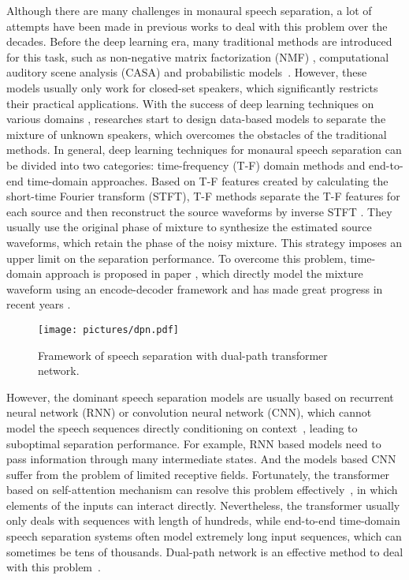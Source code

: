 \documentclass[a4paper]{article}
\begin{document}
Although there are many challenges in
monaural speech separation, a lot of attempts have been made in previous works to deal with this problem over the decades. Before the deep learning era, many traditional methods are introduced for this task, such as non-negative matrix factorization (NMF) \cite{schmidt2006single-channel,le2015deep}, computational auditory scene analysis (CASA) \cite{wang2008computational} and probabilistic models~\cite{virtanen2006speech}. However, these models usually only work for closed-set speakers, which significantly restricts their practical applications. With the success of deep learning techniques on various domains \cite{gou2018sparsity,ocquaye2019dual},
researches start to design data-based models to separate the mixture of unknown speakers, which overcomes the obstacles of the traditional methods. In general, deep learning techniques for monaural speech separation can be divided into two categories: time-frequency (T-F) domain methods and end-to-end time-domain approaches. Based on T-F features created by calculating the short-time Fourier transform (STFT), T-F methods separate the T-F features for each source and then reconstruct the source waveforms by inverse STFT \cite{hershey2016deep,chen2017deep,yu2017permutation,kolbaek2017multitalker,yang2019improved}. They usually use the original phase of mixture to synthesize the estimated source waveforms, which retain the phase of the noisy mixture. This strategy imposes an upper limit on the separation performance. To overcome this problem, time-domain approach is proposed in paper \cite{luo2018tasnet} , which directly model the mixture waveform using an encode-decoder framework and has made great progress in recent years \cite{luo2019conv,shi2019deep,shi2019end,takahashi2019recursive,ditter2019multi,luo2019dual,zeghidour2020wavesplit}.

\begin{figure*}[t]
  \centering
  \texttt{[image: pictures/dpn.pdf]}
  \caption{Framework of speech separation with dual-path transformer network.}
  \label{fig:dpt}
\end{figure*}

However, the dominant speech separation models are usually based on recurrent neural network (RNN) or convolution neural network (CNN), which cannot model the speech sequences directly conditioning on context~\cite{sperber2018self}, leading to suboptimal separation performance. For example, RNN based models need to pass information through many intermediate states. And the models based CNN suffer from the problem of limited receptive fields. Fortunately, the transformer based on self-attention mechanism can resolve this problem effectively~\cite{vaswani2017attention}, in which elements of the inputs can interact directly. Nevertheless, the transformer usually only deals with sequences with length of hundreds, while end-to-end time-domain speech separation systems often model extremely long input sequences, which can sometimes be tens of thousands. Dual-path network is an effective method to deal with this problem~\cite{luo2019dual}.
\end{document}
